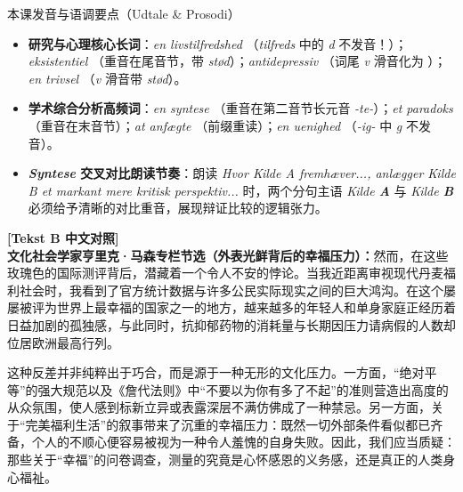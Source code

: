 \begin{tipbox}{本课发音与语调要点（Udtale \& Prosodi）}
\begin{itemize}
  \item \textbf{研究与心理核心长词}：\textit{en livstilfredshed} （\textit{tilfreds} 中的 \textit{d} 不发音！）；\textit{eksistentiel} （重音在尾音节，带 \textit{stød}）；\textit{antidepressiv} （词尾 \textit{v} 滑音化为 ）；\textit{en trivsel} （\textit{v} 滑音带 \textit{stød}）。
  \item \textbf{学术综合分析高频词}：\textit{en syntese} （重音在第二音节长元音 \textit{-te-}）；\textit{et paradoks} （重音在末音节）；\textit{at anfægte} （前缀重读）；\textit{en uenighed} （\textit{-ig-} 中 \textit{g} 不发音）。
  \item \textbf{\textit{Syntese} 交叉对比朗读节奏}：朗读 \textit{Hvor Kilde A fremhæver..., anlægger Kilde B et markant mere kritisk perspektiv...} 时，两个分句主语 \textit{Kilde \textbf{A}} 与 \textit{Kilde \textbf{B}} 必须给予清晰的对比重音，展现辩证比较的逻辑张力。
\end{itemize}
\end{tipbox}

\begin{transbox}
\small
\textbf{\color{NCDTeal}[Tekst B 中文对照]}\\
\textbf{文化社会学家亨里克·马森专栏节选（外表光鲜背后的幸福压力）：}然而，在这些玫瑰色的国际测评背后，潜藏着一个令人不安的悖论。当我近距离审视现代丹麦福利社会时，我看到了官方统计数据与许多公民实际现实之间的巨大鸿沟。在这个屡屡被评为世界上最幸福的国家之一的地方，越来越多的年轻人和单身家庭正经历着日益加剧的孤独感，与此同时，抗抑郁药物的消耗量与长期因压力请病假的人数却位居欧洲最高行列。

这种反差并非纯粹出于巧合，而是源于一种无形的文化压力。一方面，“绝对平等”的强大规范以及《詹代法则》中“不要以为你有多了不起”的准则营造出高度的从众氛围，使人感到标新立异或表露深层不满仿佛成了一种禁忌。另一方面，关于“完美福利生活”的叙事带来了沉重的幸福压力：既然一切外部条件看似都已齐备，个人的不顺心便容易被视为一种令人羞愧的自身失败。因此，我们应当质疑：那些关于“幸福”的问卷调查，测量的究竟是心怀感恩的义务感，还是真正的人类身心福祉。
\end{transbox}


